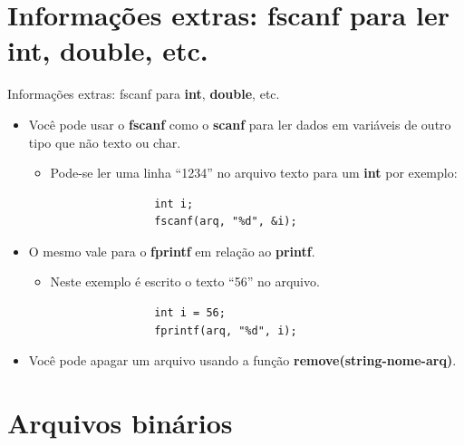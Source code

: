 \documentclass[handout]{beamer}
\begin{document}
\section{Informações extras: fscanf para ler int, double, etc.}

\begin{frame}[fragile]{Informações extras: fscanf para \textbf{int}, \textbf{double}, etc.}
    \begin{itemize}
        \item Você pode usar o \textbf{fscanf} como o \textbf{scanf} para ler dados
        em variáveis de outro tipo que não texto ou char.
        \begin{itemize}
            \item Pode-se ler uma linha ``1234'' no arquivo texto para um \textbf{int} por exemplo:
            \begin{verbatim}
                int i;
                fscanf(arq, "%d", &i);
            \end{verbatim}
        \end{itemize}

        \item O mesmo vale para o \textbf{fprintf} em relação ao \textbf{printf}.
        \begin{itemize}
            \item Neste exemplo é escrito o texto ``56'' no arquivo.
            \begin{verbatim}
                int i = 56;
                fprintf(arq, "%d", i);
            \end{verbatim}
        \end{itemize}

        \item Você pode apagar um arquivo usando a função \textbf{remove(string-nome-arq)}.
    \end{itemize}

\end{frame}


\section{Arquivos binários}
\end{document}
